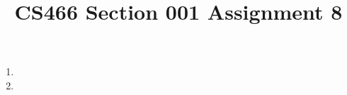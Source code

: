 \documentclass[12pt]{article}
\title{CS466 Section 001 Assignment 8}
\begin{document}
\maketitle

\begin{enumerate}
\item
\item
\end{enumerate}
\end{document}
